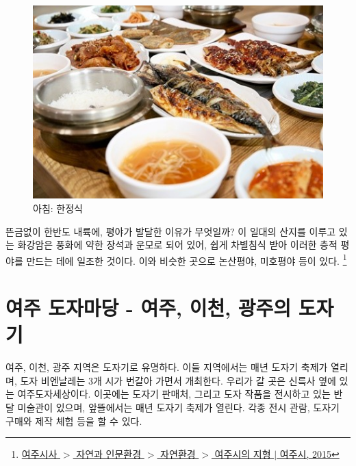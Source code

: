 \begin{figure}[ht]
    \centering
    \includegraphics[width=.6\textwidth]{img/한정식.jpg}
    \caption{아침: 한정식 \protect\footnotemark}
    \label{fig:my_labe2}
\end{figure}
뜬금없이 한반도 내륙에, 평야가 발달한 이유가 무엇일까?
이 일대의 산지를 이루고 있는 화강암은 풍화에 약한 장석과 운모로 되어 있어, 
쉽게 차별침식 받아 이러한 층적 평야를 만드는 데에 일조한 것이다.
이와 비슷한 곳으로 논산평야, 미호평야 등이 있다.
\footnote{ \href{https://www.yeoju.go.kr/history/main.jsp}{여주시사 $>$ 자연과 인문환경 $>$ 자연환경 $>$ 여주시의 지형 $|$ 여주시, 2015}}

\section{여주 도자마당 - 여주, 이천, 광주의 도자기}
여주, 이천, 광주 지역은 도자기로 유명하다. 이들 지역에서는 매년 도자기 축제가 열리며, 도자 비엔날레는 3개 시가 번갈아 가면서 개최한다.
우리가 갈 곳은 신륵사 옆에 있는 여주도자세상이다.
이곳에는 도자기 판매처, 그리고 도자 작품을 전시하고 있는 반달 미술관이 있으며, 앞뜰에서는 매년 도자기 축제가 열린다. 
각종 전시 관람, 도자기 구매와 제작 체험 등을 할 수 있다.

